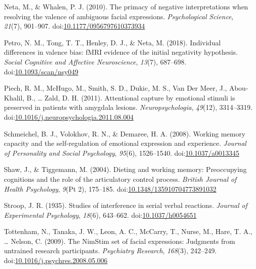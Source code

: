 \documentclass[man]{apa6}
\begin{document}
\leavevmode\hypertarget{ref-neta_primacy_2010}{}%
Neta, M., \& Whalen, P. J. (2010). The primacy of negative interpretations when resolving the valence of ambiguous facial expressions. \emph{Psychological Science}, \emph{21}(7), 901--907. doi:\href{https://doi.org/10.1177/0956797610373934}{10.1177/0956797610373934}

\leavevmode\hypertarget{ref-petro_individual_2018}{}%
Petro, N. M., Tong, T. T., Henley, D. J., \& Neta, M. (2018). Individual differences in valence bias: fMRI evidence of the initial negativity hypothesis. \emph{Social Cognitive and Affective Neuroscience}, \emph{13}(7), 687--698. doi:\href{https://doi.org/10.1093/scan/nsy049}{10.1093/scan/nsy049}

\leavevmode\hypertarget{ref-piech_attentional_2011}{}%
Piech, R. M., McHugo, M., Smith, S. D., Dukic, M. S., Van Der Meer, J., Abou-Khalil, B., \ldots{} Zald, D. H. (2011). Attentional capture by emotional stimuli is preserved in patients with amygdala lesions. \emph{Neuropsychologia}, \emph{49}(12), 3314--3319. doi:\href{https://doi.org/10.1016/j.neuropsychologia.2011.08.004}{10.1016/j.neuropsychologia.2011.08.004}

\leavevmode\hypertarget{ref-schmeichel_working_2008}{}%
Schmeichel, B. J., Volokhov, R. N., \& Demaree, H. A. (2008). Working memory capacity and the self-regulation of emotional expression and experience. \emph{Journal of Personality and Social Psychology}, \emph{95}(6), 1526--1540. doi:\href{https://doi.org/10.1037/a0013345}{10.1037/a0013345}

\leavevmode\hypertarget{ref-shaw_dieting_2004}{}%
Shaw, J., \& Tiggemann, M. (2004). Dieting and working memory: Preoccupying cognitions and the role of the articulatory control process. \emph{British Journal of Health Psychology}, \emph{9}(Pt 2), 175--185. doi:\href{https://doi.org/10.1348/135910704773891032}{10.1348/135910704773891032}

\leavevmode\hypertarget{ref-stroop_studies_1935}{}%
Stroop, J. R. (1935). Studies of interference in serial verbal reactions. \emph{Journal of Experimental Psychology}, \emph{18}(6), 643--662. doi:\href{https://doi.org/10.1037/h0054651}{10.1037/h0054651}

\leavevmode\hypertarget{ref-tottenham_nimstim_2009}{}%
Tottenham, N., Tanaka, J. W., Leon, A. C., McCarry, T., Nurse, M., Hare, T. A., \ldots{} Nelson, C. (2009). The NimStim set of facial expressions: Judgments from untrained research participants. \emph{Psychiatry Research}, \emph{168}(3), 242--249. doi:\href{https://doi.org/10.1016/j.psychres.2008.05.006}{10.1016/j.psychres.2008.05.006}
\end{document}
